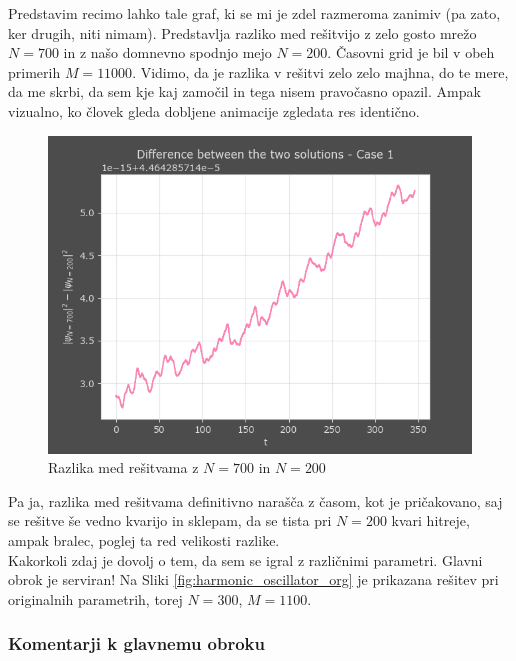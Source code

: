 \documentclass[a4paper]{article}
\begin{document}
Predstavim recimo lahko tale graf, ki se mi je zdel razmeroma zanimiv (pa zato, ker drugih, niti
nimam). Predstavlja razliko med rešitvijo z zelo gosto mrežo $N=700$ in z našo domnevno spodnjo
mejo $N=200$. Časovni grid je bil v obeh primerih $M=11000$. Vidimo, da je razlika v rešitvi
zelo zelo majhna, do te mere, da me skrbi, da sem kje kaj zamočil in tega nisem pravočasno opazil.
Ampak vizualno, ko človek gleda dobljene animacije zgledata res identično.

\begin{figure}[H]
    \centering
    \includegraphics[width=\textwidth]{./images/delta_N700_N200.png}
    \caption{Razlika med rešitvama z $N=700$ in $N=200$}
\end{figure}

Pa ja, razlika med rešitvama definitivno narašča z časom, kot je pričakovano, saj se rešitve še vedno kvarijo
in sklepam, da se tista pri $N=200$ kvari hitreje, ampak bralec, poglej ta red velikosti razlike. \\

Kakorkoli zdaj je dovolj o tem, da sem se igral z različnimi parametri. Glavni obrok je serviran! Na Sliki
\ref{fig:harmonic_oscillator_org} je prikazana rešitev pri originalnih parametrih, torej $N=300$, $M=1100$. \\

\subsubsection{Komentarji k glavnemu obroku}
\end{document}
